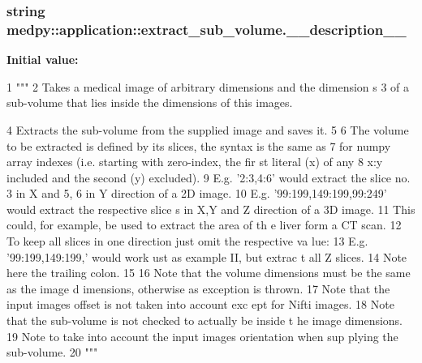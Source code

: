 \hypertarget{namespacemedpy_1_1application_1_1extract__sub__volume_a0446e20791fb37d8718ca9467da0803b}{
\subsubsection[{\_\-\_\-description\_\-\_\-}]{\setlength{\rightskip}{0pt plus 5cm}string {\bf medpy::application::extract\_\-sub\_\-volume.\_\-\_\-description\_\-\_\-}}}
\label{namespacemedpy_1_1application_1_1extract__sub__volume_a0446e20791fb37d8718ca9467da0803b}
{\bfseries Initial value:}
\begin{DoxyCode}
1 """
2                   Takes a medical image of arbitrary dimensions and the dimension
      s
3                   of a sub-volume that lies inside the dimensions of this images.
      
4                   Extracts the sub-volume from the supplied image and saves it.
5                   
6                   The volume to be extracted is defined by its slices, the syntax
       is the same as
7                   for numpy array indexes (i.e. starting with zero-index, the fir
      st literal (x) of any
8                   x:y included and the second (y) excluded).
9                   E.g. '2:3,4:6' would extract the slice no. 3 in X and 5, 6 in Y
       direction of a 2D image.
10                   E.g. '99:199,149:199,99:249' would extract the respective slice
      s in X,Y and Z direction of a 3D image.
11                        This could, for example, be used to extract the area of th
      e liver form a CT scan.
12                   To keep all slices in one direction just omit the respective va
      lue:
13                   E.g. '99:199,149:199,' would work ust as example II, but extrac
      t all Z slices.
14                        Note here the trailing colon.
15                        
16                   Note that the volume dimensions must be the same as the image d
      imensions, otherwise as exception is thrown.
17                   Note that the input images offset is not taken into account exc
      ept for Nifti images.
18                   Note that the sub-volume is not checked to actually be inside t
      he image dimensions.
19                   Note to take into account the input images orientation when sup
      plying the sub-volume.
20                   """
\end{DoxyCode}


